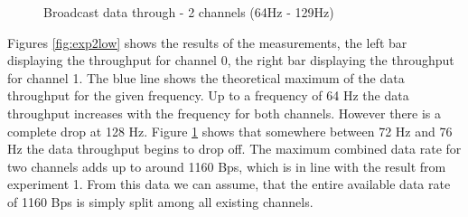 \begin{description}
\begin{figure}[h]
		\caption{Broadcast data through - 2 channels (64Hz - 129Hz)}\label{fig:exp2high}
	\end{figure}
	Figures \ref{fig:exp2low} shows the results of the measurements, the left bar displaying the throughput for channel 0, the right bar displaying the throughput for channel 1. The blue line shows the theoretical maximum of the data throughput for the given frequency. Up to a frequency of 64 Hz the data throughput increases with the frequency for both channels. However there is a complete drop at 128 Hz. Figure \ref{fig:exp2high} shows that somewhere between 72 Hz and 76 Hz the data throughput begins to drop off. The maximum combined data rate for two channels adds up to around 1160 Bps, which is in line with the result from experiment 1. From this data we can assume, that the entire available data rate of 1160 Bps is simply split among all existing channels.
\end{description}
\newpage


